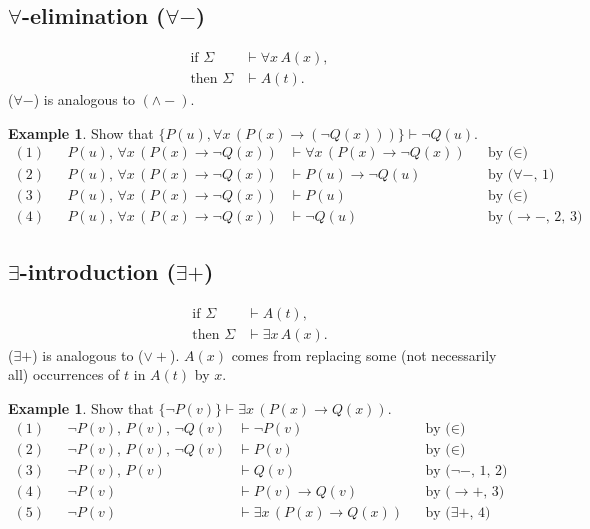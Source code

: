 \documentclass[11pt]{article}
\theoremstyle{definition}
\newtheorem{exmp}[thm]{Example}
\begin{document}
\subsection{$\forall$-elimination ($\forall-$)}
\vspace{-0.25cm}
\begin{align*}
    \text{if } \Sigma &\vdash \forall x \, A(x), \\
    \text{then } \Sigma &\vdash A(t).
\end{align*}
($\forall-$) is analogous to $(\wedge-)$.

\begin{exmp}
Show that $\{P(u), \forall x \, (P(x) \rightarrow (\neg Q(x)))\} \vdash \neg Q(u)$.
\begin{align*}
    (1) & & P(u),\, \forall x \, (P(x) \rightarrow \neg Q(x)) &\vdash \forall x \, (P(x) \rightarrow \neg Q(x)) & & \text{by ($\in$)} \\
    (2) & & P(u),\, \forall x \, (P(x) \rightarrow \neg Q(x)) &\vdash P(u) \rightarrow \neg Q(u) & & \text{by ($\forall-$, 1)} \\
    (3) & & P(u),\, \forall x \, (P(x) \rightarrow \neg Q(x)) &\vdash P(u) & & \text{by ($\in$)} \\
    (4) & & P(u),\, \forall x \, (P(x) \rightarrow \neg Q(x)) &\vdash \neg Q(u) & & \text{by ($\rightarrow-$, 2, 3)} 
\end{align*}
\end{exmp}

\subsection{$\exists$-introduction ($\exists+$)}
\vspace{-0.25cm}
\begin{align*}
    \text{if } \Sigma &\vdash A(t), \\
    \text{then } \Sigma &\vdash \exists x \, A(x).
\end{align*}
($\exists+$) is analogous to ($\vee+$). $A(x)$ comes from replacing some (not necessarily all) occurrences of $t$ in $A(t)$ by $x$.


\begin{exmp}
Show that $\{\neg P(v)\} \vdash \exists x\,(P(x) \rightarrow Q(x))$.
\begin{align*}
    (1) & & \neg P(v),\, P(v),\, \neg Q(v) &\vdash \neg P(v) & & \text{by ($\in$)} \\
    (2) & & \neg P(v),\, P(v),\, \neg Q(v) &\vdash P(v) & & \text{by ($\in$)} \\
    (3) & & \neg P(v),\, P(v) &\vdash Q(v) & & \text{by ($\neg-$, 1, 2)} \\
    (4) & & \neg P(v) &\vdash P(v) \rightarrow Q(v) & & \text{by ($\rightarrow+$, 3)} \\
    (5) & & \neg P(v) &\vdash \exists x\,(P(x) \rightarrow Q(x)) & & \text{by ($\exists+$, 4)}
\end{align*}
\end{exmp}
\end{document}
